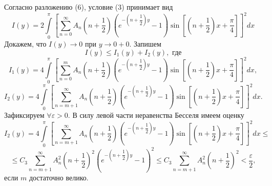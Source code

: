 \documentclass[a4paper, 9pt]{article}
\begin{document}
	Согласно разложению (6), условие (3) принимает вид
	\begin{equation*}
		I(y) =  2 \int\limits_0^\pi \left[	\sum\limits_{n=0}^{\infty} A_n\left(n+\dfrac12\right) \left( e^{-\left(n+\dfrac12\right)y} - 1\right) \sin{\left[\left(n+\dfrac12\right) x  + \dfrac\pi4\right]} \right]^2 dx
	\end{equation*}
	Докажем, что $I(y) \to 0$ при $y \to 0+0$. Запишем
	\begin{equation*}
		I(y) \leq I_1(y) + I_2(y), \text{ где}
	\end{equation*}
	\begin{equation*}
		I_1(y) = 4\int\limits_0^\pi \left[	\sum\limits_{n=0}^{m} A_n\left(n+\dfrac12\right) \left( e^{-\left(n+\dfrac12\right)y} - 1\right) \sin{\left[\left(n+\dfrac12\right) x  + \dfrac\pi4\right]} \right]^2 dx, 
	\end{equation*}
	\begin{equation*}
		I_2(y) = 4\int\limits_0^\pi \left[	\sum\limits_{n=m+1}^{\infty} A_n\left(n+\dfrac12\right) \left( e^{-\left(n+\dfrac12\right)y} - 1\right) \sin{\left[\left(n+\dfrac12\right) x  + \dfrac\pi4\right]} \right]^2 dx.
	\end{equation*}
	Зафиксируем  $\forall \varepsilon > 0$. В силу левой части неравенства Бесселя имеем оценку
	\begin{equation*}
		I_2(y) =  4\int\limits_0^\pi \left[	\sum\limits_{n=m+1}^{\infty} A_n\left(n+\dfrac12\right) \left( e^{-\left(n+\dfrac12\right)y} - 1\right) \sin{\left[\left(n+\dfrac12\right) x  + \dfrac\pi4\right]} \right]^2 dx \leq 
	\end{equation*}
	\begin{equation*}
		\leq  C_3 \sum\limits_{n=m+1}^{\infty} A_n^2 \left(n+\dfrac12\right)^2 \left(e^{-\left(n+\dfrac12\right)y} - 1\right)^2 \leq C_3 \sum\limits_{n=m+1}^{\infty} A_n^2 \left(n+\dfrac12\right)^2 < \dfrac{\varepsilon}{2},
	\end{equation*}
	если  $m$ достаточно велико.\newline
	
\end{document}
